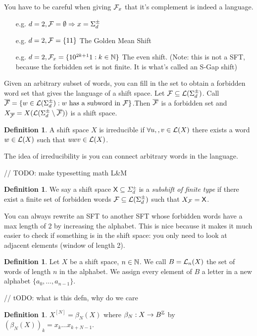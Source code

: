 \documentclass[11pt, reqno]{amsart}
\theoremstyle{plain}
\numberwithin{thm}{subsection}
\theoremstyle{definition}
\newtheorem{defn}[thm]{Definition}
\def\tsfs{\Sigma^{\pm}_d}
\begin{document}
You have to be careful when giving $\mathcal{F}_x$ that it's complement is indeed a language. 

\begin{itemize}
    \item[e.g.] $d = 2, \cF = \emptyset \Rightarrow x = \tsfs$
    \item[e.g.] $d = 2, \mathcal{F} = \{11\}$ The Golden Mean Shift 
    \item[e.g.] $d = 2, \mathcal{F}_x = \{10^{2k+1}1 : k \in \mathbb{N}\}$ The even shift. (Note: this is not a SFT, because the forbidden set is not finite. It is what's called an S-Gap shift) 
\end{itemize}

Given an arbitrary subset of words, you can fill in the set to obtain a forbidden word set that gives the language of a shift space. Let $\cF \subseteq \cL(\tsfs)$. Call $\overline{\cF} = \{w \in \cL(\tsfs) : w \text{ has a subword in } \cF \}$.Then $\overline{\mathcal{F}}$ is a forbidden set and $X_{\overline{\cF}} = X(\cL(\tsfs \setminus \overline{\cF}))$ is a shift space. 

\begin{defn}
    A shift space $X$ is irreducible if $\forall u,,v \in \mathcal{L}(X)$ there exists a word $w \in \mathcal{L}(X)$ such that $uwv \in \mathcal{L}(X)$. 
\end{defn}
The idea of irreducibility is you can connect arbitrary words in the language. 

// TODO: make typesetting math L\&M
\begin{defn}
    We say a shift space $\mathsf{X} \subseteq \tsfs$ is a \textit{subshift of finite type} if there exist a finite set of forbidden words  $\cF \subseteq \cL(\tsfs)$ such that $X_{\mathcal{F}} = \mathsf{X}$.
\end{defn}

You can always rewrite an SFT to another SFT whose forbidden words have a max length of 2 by increasing the alphabet. This is nice because it makes it much easier to check if something is in the shift space: you only need to look at adjacent elements (window of length 2). 

\begin{defn}
    Let $X$ be a shift space, $n \in \mathbb{N}$. We call $B = \mathcal{L}_n(X)$ the set of words of length $n$ in the alphabet. We assign every element of $B$ a letter in a new alphabet $\{a_0 , \dots, a_{n-1}\}$.
\end{defn}

// tODO: what is this defn, why do we care
\begin{defn}
    $X^{[N]} = \beta_N(X)$ where $\beta_N: X \rightarrow B^{\mathbb{Z}}$ by $(\beta_N(X))_k = x_k\dots x_{k+N-1}$. 
\end{defn}
\end{document}
